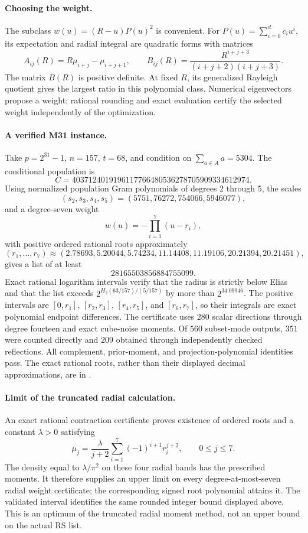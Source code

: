 \paragraph{Choosing the weight.}
The subclass $w(u)=(R-u)P(u)^2$ is convenient. For
$P(u)=\sum_{i=0}^dc_iu^i$, its expectation and radial integral are
quadratic forms with matrices
\[
 A_{ij}(R)=R\mu_{i+j}-\mu_{i+j+1},\qquad
 B_{ij}(R)=\frac{R^{i+j+3}}{(i+j+2)(i+j+3)}.
\]
The matrix $B(R)$ is positive definite. At fixed $R$, its generalized
Rayleigh quotient gives the largest ratio in this polynomial class.
Numerical eigenvectors propose a weight; rational rounding and exact
evaluation certify the selected weight independently of the optimization.

\paragraph{A verified M31 instance.}
Take $p=2^{31}-1$, $n=157$, $t=68$, and condition on
$\sum_{a\in A}a=5304$. The conditional population is
\[
 C=4037124019196117766480536278705909334612974.
\]
Using normalized population Gram polynomials of degrees $2$ through $5$,
the scales
\[
 (s_2,s_3,s_4,s_5)=(5751,76272,754066,5946077),
\]
and a degree-seven weight
\[
 w(u)=-\prod_{i=1}^7(u-r_i),
\]
with positive ordered rational roots approximately
\[
 (r_1,\ldots,r_7)\approx
 (2.78693,5.20044,5.74234,11.14408,11.19106,20.21394,20.21451),
\]
gives a list of at least
\[
 28165503856884755099.
\]
Exact rational logarithm intervals verify that the radius is strictly
below Elias and that the list exceeds
$2^{H_2(63/157)/(5/157)}$ by more than $2^{34.09946}$.
The positive intervals are $[0,r_1]$, $[r_2,r_3]$, $[r_4,r_5]$, and $[r_6,r_7]$,
so their integrals are exact polynomial endpoint differences.
The certificate uses $280$ scalar directions through degree fourteen and
exact cube-noise moments. Of $560$ subset-mode outputs, $351$ were counted
directly and $209$ obtained through independently checked reflections.
All complement, prior-moment, and projection-polynomial identities pass. The exact rational roots, rather than their displayed decimal
approximations, are in .

\paragraph{Limit of the truncated radial calculation.}
An exact rational contraction certificate proves existence of ordered
roots and a constant $\lambda>0$ satisfying
\[
 \mu_j=\frac{\lambda}{j+2}
       \sum_{i=1}^7(-1)^{i+1}r_i^{j+2},\qquad 0\le j\le7.
\]
The density equal to $\lambda/\pi^2$ on these four radial bands has
the prescribed moments. It therefore supplies an upper limit on every
degree-at-most-seven radial weight certificate; the corresponding signed
root polynomial attains it. The validated interval identifies the same
rounded integer bound displayed above. This is an optimum of the
truncated radial moment method, not an upper bound on the actual RS list.

